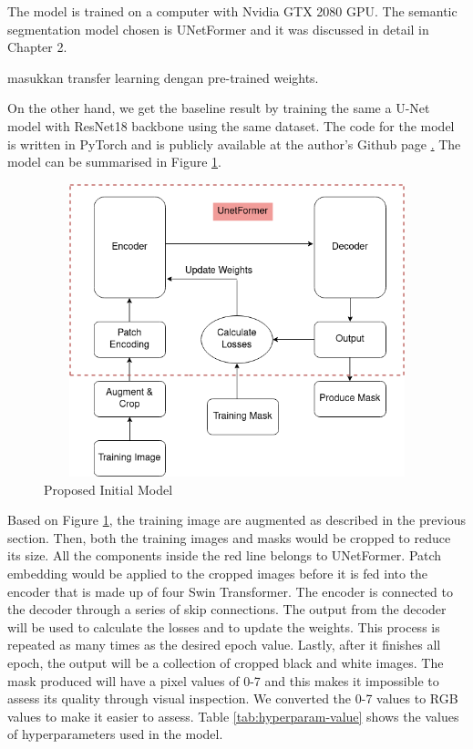The model is trained on a computer with Nvidia GTX 2080 GPU. The semantic segmentation model chosen is UNetFormer \cite{unetformer} and it was discussed in detail in Chapter 2.

masukkan transfer learning dengan pre-trained weights.

On the other hand, we get the baseline result by training the same a U-Net model with ResNet18 backbone using the same dataset. The code for the model is written in PyTorch and is publicly available at the author's Github page \href{https://github.com/WangLibo1995/GeoSeg}. The model can be summarised in Figure \ref{fig:initial-model}.

\begin{figure}[!h]
\includegraphics[width=13.0cm, height=8.5cm]{images/initial model.png}
\caption{Proposed Initial Model}
\label{fig:initial-model}
\end{figure}

Based on Figure \ref{fig:initial-model}, the training image are augmented as described in the previous section. Then, both the training images and masks would be cropped to reduce its size. All the components inside the red line belongs to UNetFormer. Patch embedding would be applied to the cropped images before it is fed into the encoder that is made up of four Swin Transformer. The encoder is connected to the decoder through a series of skip connections. The output from the decoder will be used to calculate the losses and to update the weights. This process is repeated as many times as the desired epoch value. Lastly, after it finishes all epoch, the output will be a collection of cropped black and white images. The mask produced will have a pixel values of 0-7 and this makes it impossible to assess its quality through visual inspection. We converted the 0-7 values to RGB values to make it easier to assess. Table \ref{tab:hyperparam-value} shows the values of hyperparameters used in the model.

